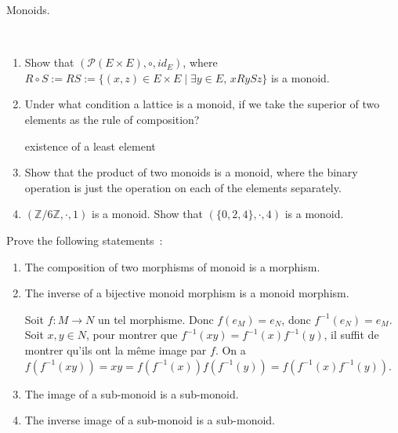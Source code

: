 \documentclass[a4paper,11pt]{exam}
\newcommand{\Z}{\mathbb{Z}}
\begin{document}
\begin{questions}
	
  \bigskip
\colorbox{gris}{
	\begin{minipage}[c]{15cm}
		Monoids.
	\end{minipage}
}	
	
  \question
  ~\vspace{-0.4cm}
  \begin{enumerate}
    \item Show that $(\mathcal{P}(E \times E), \circ, id_E)$, where
      $R \circ S := RS :=
      \{(x,z) \in E \times E \mid \exists y \in E,\, xRySz\}$ is a monoid.
    \item Under what condition a lattice is a monoid, if we take the superior of two elements as the rule of composition?
    \begin{solution}
    	existence of a least element
    \end{solution}
    \item Show that the product of two monoids is a monoid, where the binary operation is just the operation on each of the elements separately.
    \item $(\Z/6\Z, \cdot, 1)$ is a monoid.
      Show that $(\{0,2,4\}, \cdot, 4)$ is a monoid.
  \end{enumerate}

  \question
 Prove the following statements~:

  \begin{enumerate}
    \item  The composition of two morphisms of monoid is a morphism.
    \item The inverse of a bijective monoid morphism is a monoid morphism.

      \begin{solution}
        Soit $f: M \to N$ un tel morphisme.
        Donc $f(e_M) = e_N$, donc $f^{-1}(e_N) = e_M$.
        Soit $x,y \in N$, pour montrer que $f^{-1}(xy) = f^{-1}(x) f^{-1}(y)$,
        il suffit de montrer qu'ils ont la même image par $f$.
        On a $f(f^{-1}(xy)) = xy = f(f^{-1}(x)) f(f^{-1}(y))
        = f(f^{-1}(x) f^{-1}(y))$. 
      \end{solution}

    \item The image of a sub-monoid is a sub-monoid.
    \item The inverse image of a sub-monoid is a sub-monoid.

  \end{enumerate} 


\end{questions}
\end{document}
